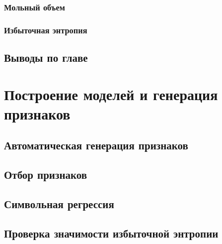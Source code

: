 \documentclass[a4paper,12pt]{article}
\begin{document}
    \subsubsection{Мольный объем}

    \subsubsection{Избыточная энтропия}


% 
% 


  \subsection{Выводы по главе}
\newpage

\section{Построение моделей и генерация признаков}
  \subsection{Автоматическая генерация признаков}
  \subsection{Отбор признаков}
  \subsection{Символьная регрессия}
  \subsection{Проверка значимости избыточной энтропии}
\end{document}
